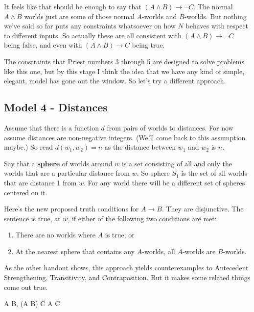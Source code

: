 \documentclass[
]{article}
\providecommand{\tightlist}{%
  \setlength{\itemsep}{0pt}\setlength{\parskip}{0pt}}\usepackage{longtable,booktabs,array}
\begin{document}
It feels like that should be enough to say that
\((A \wedge B) \rightarrow \neg C\). The normal \(A \wedge B\) worlds
just are some of those normal \(A\)-worlds and \(B\)-worlds. But nothing
we've said so far puts any constraints whatsoever on how \(N\) behaves
with respect to different inputs. So actually these are all consistent
with \((A \wedge B) \rightarrow \neg C\) being false, and even with
\((A \wedge B) \rightarrow C\) being true.

The constraints that Priest numbers 3 through 5 are designed to solve
problems like this one, but by this stage I think the idea that we have
any kind of simple, elegant, model has gone out the window. So let's try
a different approach.

\hypertarget{model-4---distances}{%
\subsection{Model 4 - Distances}\label{model-4---distances}}

Assume that there is a function \(d\) from pairs of worlds to distances.
For now assume distances are non-negative integers. (We'll come back to
this assumption maybe.) So read \(d(w_1, w_2) = n\) as the distance
between \(w_1\) and \(w_2\) is \(n\).

Say that a \textbf{sphere} of worlds around \(w\) is a set consisting of
all and only the worlds that are a particular distance from \(w\). So
sphere \(S_1\) is the set of all worlds that are distance 1 from \(w\).
For any world there will be a different set of spheres centered on it.

Here's the new proposed truth conditions for \(A \rightarrow B\). They
are disjunctive. The sentence is true, at \(w\), if either of the
following two conditions are met:

\begin{enumerate}
\def\labelenumi{\arabic{enumi}.}
\tightlist
\item
  There are no worlds where \(A\) is true; or
\item
  At the nearest sphere that contains any \(A\)-worlds, all \(A\)-worlds
  are \(B\)-worlds.
\end{enumerate}

As the other handout shows, this approach yields counterexamples to
Antecedent Strengthening, Transitivity, and Contraposition. But it makes
some related things come out true.

\begin{description}
\tightlist
\item[Modified Transitivity]
A \rightarrow B, (A \wedge B) \rightarrow C \vdash A \rightarrow C
\end{description}
\end{document}
